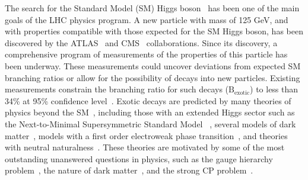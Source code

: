 %


The search for the Standard Model (SM) Higgs 
boson~\cite{Englert:1964et,Higgs:1964pj,Higgs:1964ia,Guralnik:1964eu}  
has been one of the main goals of the LHC physics program.  
A new particle with mass  of 125 GeV, and with  properties compatible with those expected for the SM Higgs boson, 
has been discovered by the ATLAS~\cite{HIGG-2012-27} and CMS~\cite{Chatrchyan:2012xdj} collaborations.
Since its discovery, a comprehensive program of measurements of the properties of this particle has been underway.
These measurements could uncover deviations from expected SM branching ratios or 
allow for the possibility of decays into new particles. 
Existing measurements constrain the branching ratio for such decays ($\text{B}_\text{exotic}$) 
to less than 34\% at 95\% confidence level~\cite{Khachatryan:2016vau}.
Exotic decays are predicted by many theories of physics beyond the SM~\cite{Curtin:2013fra},
including those with an extended Higgs sector 
such as the Next-to-Minimal Supersymmetric Standard Model 
~\cite{Dobrescu:2000yn,Ellwanger:2003jt,Dermisek:2005ar,Chang:2008cw,Morrissey:2008gm},
several models of dark matter~\cite{SILVEIRA1985136,Pospelov:2007mp,Draper:2010ew,Ipek:2014gua,Martin:2014sxa},
models with a first order electroweak phase transition~\cite{Profumo:2007wc,Blinov:2015sna},
and theories with neutral naturalness~\cite{Burdman:2006tz,Craig:2015pha,Curtin:2015fna}.
These theories are motivated by some of the most outstanding unanswered questions in physics, such as the gauge hierarchy problem~\cite{Nilles:1982dy}, the nature of dark matter~\cite{Trimble:1987ee}, and the strong CP problem~\cite{Peccei:1977hh}.

